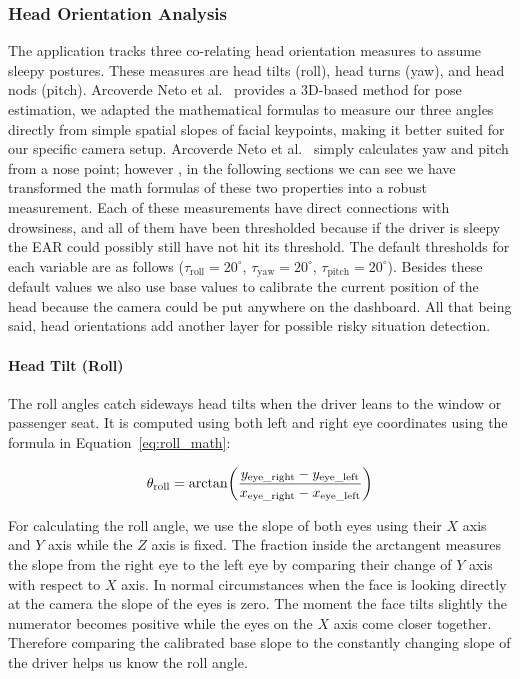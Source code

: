 \documentclass[pdflatex,sn-mathphys-num]{sn-jnl}
\theoremstyle{thmstyleone}%
\theoremstyle{thmstyletwo}%
\theoremstyle{thmstylethree}%
\begin{document}
	\subsubsection{Head Orientation Analysis}\label{sec:head}
	The application tracks three co-relating head orientation measures to assume sleepy postures. These measures are head tilts (roll), head turns (yaw), and head nods (pitch). Arcoverde Neto et al.~\cite{bib22} provides a 3D-based method for pose estimation, we adapted the mathematical formulas to measure our three angles directly from simple spatial slopes of facial keypoints, making it better suited for our specific camera setup. Arcoverde Neto et al.~\cite{bib22} simply calculates yaw and pitch from a nose point; however , in the following sections we can see we have transformed the math formulas of these two properties into a robust measurement. Each of these measurements have direct connections with drowsiness, and all of them have been thresholded because if the driver is sleepy the EAR could possibly still have not hit its threshold. The default thresholds for each variable are as follows ($\tau_{\mathrm{roll}} = 20^\circ$, $\tau_{\mathrm{yaw}} = 20^\circ$, $\tau_{\mathrm{pitch}} = 20^\circ$). Besides these default values we also use base values to calibrate the current position of the head because the camera could be put anywhere on the dashboard. All that being said, head orientations add another layer for possible risky situation detection.
	
	\paragraph{Head Tilt (Roll)}
	
	The roll angles catch sideways head tilts when the driver leans to the window or passenger seat. It is computed using both left and right eye coordinates using the formula in Equation~\ref{eq:roll_math}:
	
	\begin{equation}
		\label{eq:roll_math}
		\begin{gathered}
			\theta_{\mathrm{roll}} = \arctan\!\left( \frac{y_{\text{eye\_right}} - y_{\text{eye\_left}}}{x_{\text{eye\_right}} - x_{\text{eye\_left}}} \right)
		\end{gathered}
		\\[0.5em]
	\end{equation}
	
	For calculating the roll angle, we use the slope of both eyes using their $X$ axis and $Y$ axis while the $Z$ axis is fixed. The fraction inside the arctangent measures the slope from the right eye to the left eye by comparing their change of $Y$ axis with respect to $X$ axis. In normal circumstances when the face is looking directly at the camera the slope of the eyes is zero. The moment the face tilts slightly the numerator becomes positive while the eyes on the $X$ axis come closer together. Therefore comparing the calibrated base slope to the constantly changing slope of the driver helps us know the roll angle.
	
\end{document}
